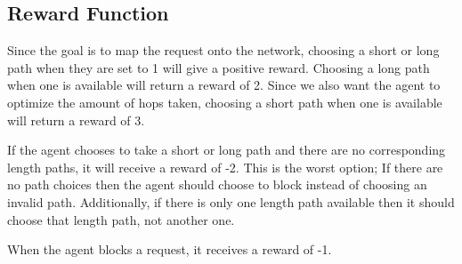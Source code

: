 \documentclass[conference]{IEEEtran}
\begin{document}
\subsection{Reward Function}
\begin{flushleft}
Since the goal is to map the request onto the network, choosing a short or long path when they are set to 1 will give a positive reward. Choosing a long path when one is available will return a reward of 2. Since we also want the agent to optimize the amount of hops taken, choosing a short path when one is available will return a reward of 3. 
\end{flushleft}
\begin{flushleft}
If the agent chooses to take a short or long path and there are no corresponding length paths, it will receive a reward of -2. This is the worst option; If there are no path choices then the agent should choose to block instead of choosing an invalid path. Additionally, if there is only one length path available then it should choose that length path, not another one.
\end{flushleft}
\begin{flushleft}
When the agent blocks a request, it receives a reward of -1.
\end{flushleft}
\end{document}
